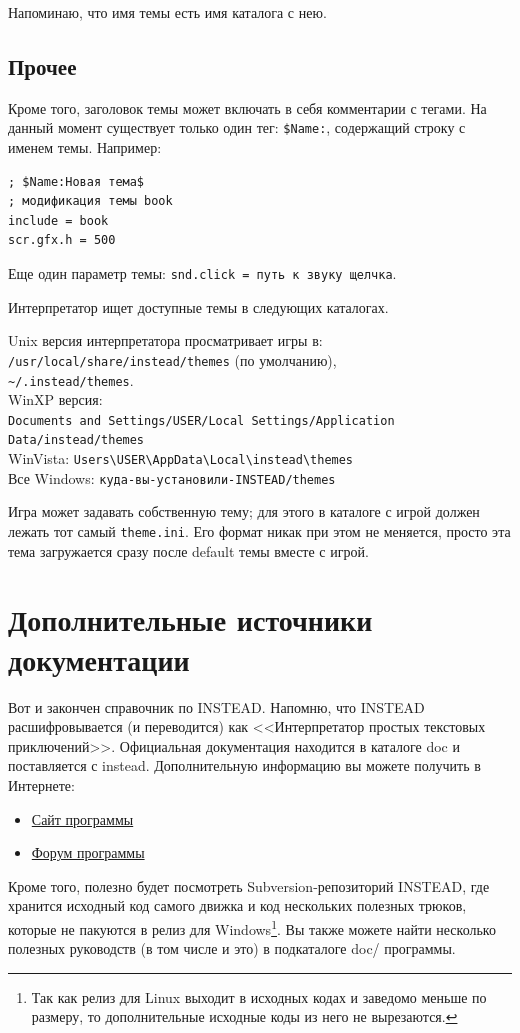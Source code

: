 \documentclass[a4paper,12pt]{article}
\begin{document}
\medskip
Напоминаю, что имя темы есть имя каталога с нею.

\subsection{Прочее}

Кроме того, заголовок темы может включать в себя комментарии с тегами. На данный момент существует только один тег: \verb/$Name:/, содержащий строку с именем темы. Например:

\begin{verbatim}
; $Name:Новая тема$
; модификация темы book
include = book
scr.gfx.h = 500
\end{verbatim}

Еще один параметр темы: \verb/snd.click = путь к звуку щелчка/.

Интерпретатор ищет доступные темы в следующих каталогах.

Unix версия интерпретатора просматривает игры в:\\
\verb;/usr/local/share/instead/themes; (по умолчанию),\\
\verb,~/.instead/themes,.\\
WinXP версия:\\
\verb;Documents and Settings/USER/Local Settings/Application Data/instead/themes;\\
WinVista: \verb;Users\USER\AppData\Local\instead\themes;\\
Все Windows: \verb;куда-вы-установили-INSTEAD/themes;

Игра может задавать собственную тему; для этого в каталоге с игрой должен лежать тот самый \verb/theme.ini/. Его формат никак при этом не меняется, просто эта тема загружается сразу после default темы вместе с игрой.

\section{Дополнительные источники документации}
Вот и закончен справочник по INSTEAD. Напомню, что INSTEAD расшифровывается (и переводится) как <<Интерпретатор простых текстовых приключений>>. Официальная документация находится в каталоге doc и поставляется с instead. Дополнительную информацию вы можете получить в Интернете:

\begin{itemize}
\item \href{http://instead.googlecode.com/}{Сайт программы}
\item \href{http://instead.pinebrush.com/}{Форум программы}
\end{itemize}

Кроме того, полезно будет посмотреть Subversion-репозиторий INSTEAD, где хранится исходный код самого движка и код нескольких полезных трюков, которые не пакуются в релиз для Windows\footnote{Так как релиз для Linux выходит в исходных кодах и заведомо меньше по размеру, то дополнительные исходные коды из него не вырезаются.}. Вы также можете найти несколько полезных руководств (в том числе и это) в подкаталоге doc/ программы.

\printindex
\end{document}
